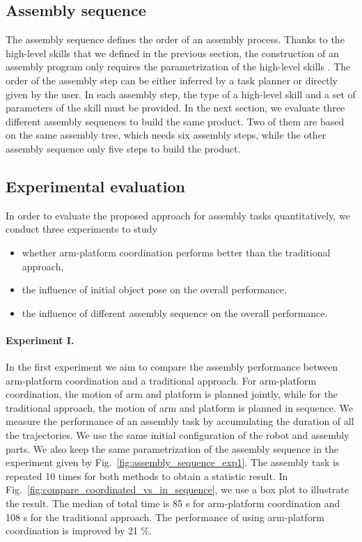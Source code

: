 \subsection{Assembly sequence}
The assembly sequence defines the order of an assembly process. Thanks to the high-level skills that we defined in the previous section, the construction of an assembly program only requires the parametrization of the high-level skills . The order of the assembly step can be either inferred by a task planner or directly given by the user. In each assembly step, the type of a high-level skill and a set of parameters of the skill must be provided. In the next section, we evaluate three different assembly sequences to build the same product. Two of them are based on the same assembly tree, which needs six assembly steps, while the other assembly sequence only five steps to build the product. 

\subsection{Experimental evaluation}
In order to  evaluate the proposed approach for assembly tasks quantitatively, we conduct three experiments to study 
\begin{itemize}
\item whether arm-platform coordination performs better than the traditional approach,
\item the influence of initial object pose on the overall performance,  
\item the influence of different assembly sequence on the overall performance.
\end{itemize}

\paragraph{Experiment I.} In the first experiment we  aim to compare the assembly performance between arm-platform coordination and a traditional approach. For arm-platform coordination, the motion of arm and platform is planned jointly, while for the traditional approach, the motion of arm and platform is planned in sequence. We measure the performance of an assembly task by accumulating the duration of all the trajectories. We use the same initial configuration of the robot and assembly parts. We also keep the same parametrization of the assembly sequence in the experiment given by Fig.~\ref{fig:assembly_sequence_exp1}. The assembly task is repeated 10 times for both methods to obtain a statistic result. In Fig.~\ref{fig:compare_coordinated_vs_in_sequence}, we use a box plot to illustrate the result. The median of total time is 85 s for arm-platform coordination and 108 s for the traditional approach. The performance of using arm-platform coordination is improved by 21 \%. 

